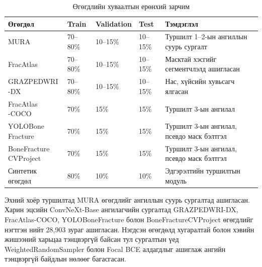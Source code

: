 \begin{table}[H]
    \centering
    \caption{Өгөгдлийн хуваалтын ерөнхий зарчим}
    \label{tab:data_split}
    \small
    \begin{tabular}{p{3.1cm} p{2.2cm} p{2.2cm} p{2.2cm} p{3.3cm}}
    \toprule
    \textbf{Өгөгдөл} & \textbf{Train} & \textbf{Validation} & \textbf{Test} & \textbf{Тэмдэглэл} \\
    \midrule
    MURA & 70--80\% & 10--15\% & 10--15\% & Туршилт 1--2-ын ангиллын суурь сургалт \\
    FracAtlas & 70--80\% & 10--15\% & 10--15\% & Масктай хэсгийг сегментчлэлд ашигласан \\
    \shortstack[l]{GRAZPEDWRI\\-DX} & 70--80\% & 10--15\% & 10--15\% & Нас, хүйсийн хувьсагч ялгасан \\
    \shortstack[l]{FracAtlas\\-COCO} & 70\% & 15\% & 15\% & Туршилт 3-ын ангилал \\
    \shortstack[l]{YOLOBone\\Fracture} & 70\% & 15\% & 15\% & Туршилт 3-ын ангилал, псевдо маск бэлтгэл \\
    \shortstack[l]{BoneFracture\\CVProject} & 70\% & 15\% & 15\% & Туршилт 3-ын ангилал, псевдо маск бэлтгэл \\
    Синтетик өгөгдөл & 80\% & 10\% & 10\% & Эдгэрэлтийн туршилтын модуль \\
    \bottomrule
    \end{tabular}
\end{table}

Эхний хоёр туршилтад MURA өгөгдлийг ангиллын суурь сургалтад ашигласан. Харин эцсийн ConvNeXt-Base ангилагчийн сургалтад GRAZPEDWRI-DX, FracAtlas-COCO, YOLOBoneFracture болон BoneFractureCVProject өгөгдлийг нэгтгэн нийт 28,903 зураг ашигласан. Нэгдсэн өгөгдөлд хугаралтай болон хэвийн жишээний харьцаа тэнцвэргүй байсан тул сургалтын үед WeightedRandomSampler болон Focal BCE алдагдлыг ашиглаж ангийн тэнцвэргүй байдлын нөлөөг багасгасан.


